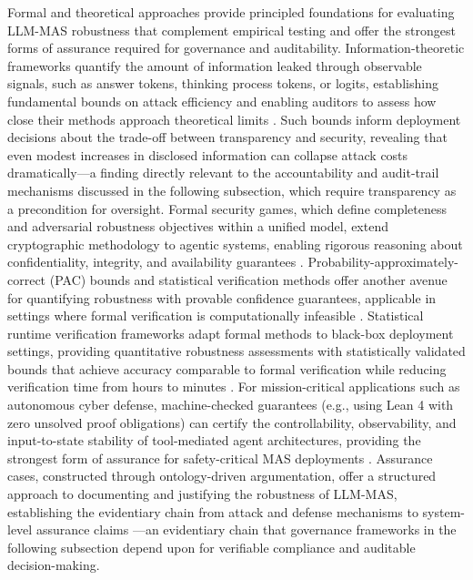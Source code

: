 \documentclass[11pt]{article}
\begin{document}
Formal and theoretical approaches provide principled foundations for evaluating LLM-MAS robustness that complement empirical testing and offer the strongest forms of assurance required for governance and auditability. Information-theoretic frameworks quantify the amount of information leaked through observable signals, such as answer tokens, thinking process tokens, or logits, establishing fundamental bounds on attack efficiency and enabling auditors to assess how close their methods approach theoretical limits \cite{ref454}. Such bounds inform deployment decisions about the trade-off between transparency and security, revealing that even modest increases in disclosed information can collapse attack costs dramatically---a finding directly relevant to the accountability and audit-trail mechanisms discussed in the following subsection, which require transparency as a precondition for oversight. Formal security games, which define completeness and adversarial robustness objectives within a unified model, extend cryptographic methodology to agentic systems, enabling rigorous reasoning about confidentiality, integrity, and availability guarantees \cite{ref455}. Probability-approximately-correct (PAC) bounds and statistical verification methods offer another avenue for quantifying robustness with provable confidence guarantees, applicable in settings where formal verification is computationally infeasible \cite{ref456}. Statistical runtime verification frameworks adapt formal methods to black-box deployment settings, providing quantitative robustness assessments with statistically validated bounds that achieve accuracy comparable to formal verification while reducing verification time from hours to minutes \cite{ref403}. For mission-critical applications such as autonomous cyber defense, machine-checked guarantees (e.g., using Lean 4 with zero unsolved proof obligations) can certify the controllability, observability, and input-to-state stability of tool-mediated agent architectures, providing the strongest form of assurance for safety-critical MAS deployments \cite{ref457}. Assurance cases, constructed through ontology-driven argumentation, offer a structured approach to documenting and justifying the robustness of LLM-MAS, establishing the evidentiary chain from attack and defense mechanisms to system-level assurance claims \cite{ref458}---an evidentiary chain that governance frameworks in the following subsection depend upon for verifiable compliance and auditable decision-making.
\end{document}
